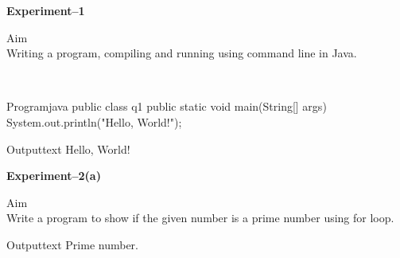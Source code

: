 \documentclass[11pt]{ipu-ai}
\renewcommand{\experiment}[2]{%
    \begin{center}%
        \textbf{\Huge Experiment--#1}\\[30pt]%
    \end{center}%
    \begin{tabularsection}{Aim}%
        ~\\#2\\%
    \end{tabularsection}}
\begin{document}
    \maketitle
    

    \experiment{1}{Writing a program, compiling and running using command line in Java.}\\%
    \begin{code}
        {Program}{java}
public class q1 {
    public static void main(String[] args) {
        System.out.println("Hello, World!");
    }
}
    \end{code}%
    \begin{code}
        {Output}{text}
Hello, World!
    \end{code}
    \vspace*{10pt}


    \experiment{2(a)}{Write a program to show if the given number is a prime number using for loop.}%
    \begin{code}
        {Output}{text}
Prime number.
    \end{code}
    \newpage%

\end{document}

